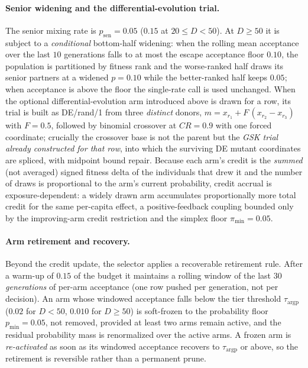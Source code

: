 \documentclass[algorithms,article,submit,moreauthors,pdftex]{Definitions/mdpi}
\begin{document}
\paragraph{Senior widening and the differential-evolution trial.}
The senior mixing rate is $p_{\mathrm{sen}}=0.05$ ($0.15$ at $20\le D<50$).  At
$D\ge 50$ it is subject to a \emph{conditional} bottom-half widening: when the rolling
mean acceptance over the last $10$ generations falls to at most the escape acceptance
floor $0.10$, the population is partitioned by fitness rank and the worse-ranked half
draws its senior partners at a widened $p=0.10$ while the better-ranked half keeps
$0.05$; when acceptance is above the floor the single-rate call is used unchanged.
When the optional differential-evolution arm introduced above is drawn for a row, its
trial is built as DE/rand/1 from three \emph{distinct} donors,
$m = x_{r_1} + F\,(x_{r_2}-x_{r_3})$ with $F=0.5$, followed by binomial crossover at
$CR=0.9$ with one forced coordinate; crucially the crossover base is not the parent but
the \emph{GSK trial already constructed for that row}, into which the surviving DE
mutant coordinates are spliced, with midpoint bound repair.  Because each arm's credit
is the \emph{summed} (not averaged) signed fitness delta of the individuals that drew
it and the number of draws is proportional to the arm's current probability, credit
accrual is exposure-dependent: a widely drawn arm accumulates proportionally more total
credit for the same per-capita effect, a positive-feedback coupling bounded only by
the improving-arm credit restriction and the simplex floor $\pi_{\min}=0.05$.

\paragraph{Arm retirement and recovery.}
Beyond the credit update, the selector applies a recoverable retirement rule.  After a
warm-up of $0.15$ of the budget it maintains a rolling window of the last $30$
\emph{generations} of per-arm acceptance (one row pushed per generation, not per
decision).  An arm whose windowed acceptance falls below the tier threshold
$\tau_{\mathrm{argp}}$ ($0.02$ for $D<50$, $0.010$ for $D\ge 50$) is soft-frozen to the
probability floor $p_{\min}=0.05$, not removed, provided at least two arms remain
active, and the residual probability mass is renormalized over the active arms.  A
frozen arm is \emph{re-activated} as soon as its windowed acceptance recovers to
$\tau_{\mathrm{argp}}$ or above, so the retirement is reversible rather than a permanent
prune.
\end{document}
